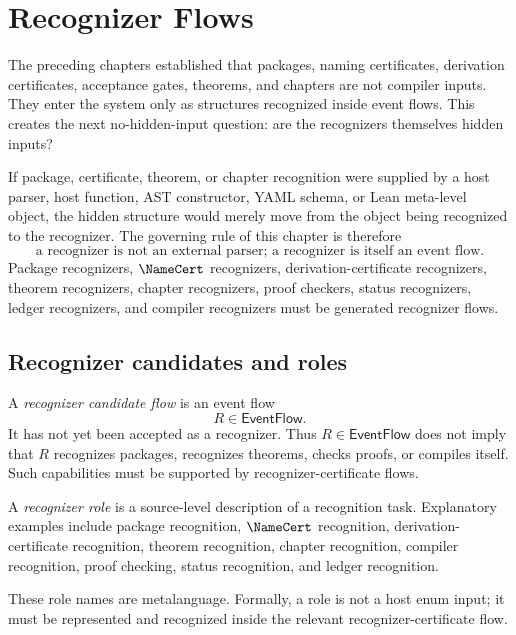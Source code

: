 \chapter{Recognizer Flows}
\label{ch:ground-compiler-recognizer-flows}

The preceding chapters established that packages, naming certificates, derivation certificates, acceptance gates, theorems, and chapters are not compiler inputs. They enter the system only as structures recognized inside event flows. This creates the next no-hidden-input question: are the recognizers themselves hidden inputs?

If package, certificate, theorem, or chapter recognition were supplied by a host parser, host function, AST constructor, YAML schema, or Lean meta-level object, the hidden structure would merely move from the object being recognized to the recognizer. The governing rule of this chapter is therefore
$$
  \boxed{\text{a recognizer is not an external parser; a recognizer is itself an event flow}.}
$$
Package recognizers, $\NameCert$ recognizers, derivation-certificate recognizers, theorem recognizers, chapter recognizers, proof checkers, status recognizers, ledger recognizers, and compiler recognizers must be generated recognizer flows.

\section{Recognizer candidates and roles}
\label{sec:recognizer-generated-candidates-roles}

\begin{definition}
\label{def:recognizer-generated-candidate-flow}
A \emph{recognizer candidate flow} is an event flow
$$
  R\in\mathsf{EventFlow}.
$$
It has not yet been accepted as a recognizer. Thus $R\in\mathsf{EventFlow}$ does not imply that $R$ recognizes packages, recognizes theorems, checks proofs, or compiles itself. Such capabilities must be supported by recognizer-certificate flows.
\end{definition}

\begin{definition}
\label{def:recognizer-generated-role}
A \emph{recognizer role} is a source-level description of a recognition task. Explanatory examples include package recognition, $\NameCert$ recognition, derivation-certificate recognition, theorem recognition, chapter recognition, compiler recognition, proof checking, status recognition, and ledger recognition.

These role names are metalanguage. Formally, a role is not a host enum input; it must be represented and recognized inside the relevant recognizer-certificate flow.
\end{definition}

